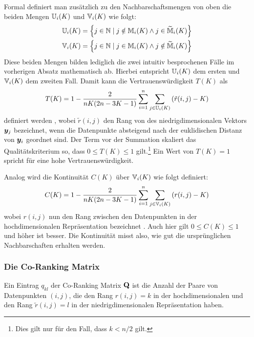 Formal definiert man zusätzlich zu den Nachbarschaftsmengen von oben die beiden Mengen
$\mathbb{U}_i(K)$ und $\mathbb{V}_i(K)$ wie folgt:
\begin{gather}
	\mathbb{U}_i(K) =  \left\{ j \in \mathbb{N} \mid j \notin \mathbb{M}_i(K) \land j \in \widetilde{\mathbb{M}}_i(K) \right\} \\
	\mathbb{V}_i(K) =  \left\{ j \in \mathbb{N} \mid j \in \mathbb{M}_i(K) \land j \notin \widetilde{\mathbb{M}}_i(K) \right\}
\end{gather}
Diese beiden Mengen bilden lediglich die zwei intuitiv besprochenen Fälle im vorherigen Absatz mathematisch ab. Hierbei entspricht $\mathbb{U}_i(K)$ dem ersten und $\mathbb{V}_i(K)$ dem zweiten Fall.
Damit kann die Vertrauenswürdigkeit $T(K)$ als
\begin{equation}
	T(K) = 1 - \frac{2}{nK(2n - 3K - 1)} \sum_{i = 1}^{n}\sum_{j \in \mathbb{U}_i(K) } \left( \tilde{r}(i, j) - K \right)
\end{equation}
definiert werden \parencite[487]{Venna.2001}, wobei $\tilde{r}(i, j)$ den Rang von des niedrigdimensionalen Vektors
$\bm{y}_j$ bezeichnet, wenn die Datenpunkte absteigend nach der euklidischen Distanz von
$\bm{y}_i$ geordnet sind. Der Term vor der Summation skaliert das Qualitätskriterium so, dass $0
	\leq T(K) \leq 1$ gilt.\footnote{Dies gilt nur für den Fall, dass $k < n/2$ gilt.} Ein Wert von
$T(K) = 1­$ spricht für eine hohe Vertrauenswürdigkeit.

Analog wird die Kontinuität $C(K)$ über $\mathbb{V}_i(K)$ wie folgt definiert:
\begin{equation}
	C(K) = 1 - \frac{2}{nK(2n - 3K - 1)} \sum_{i = 1}^{n}\sum_{j \in \mathbb{V}_i(K) } \left( r(i, j) - K \right)
\end{equation}
wobei $r(i, j)$ nun den Rang zwischen den Datenpunkten in der hochdimensionalen Repräsentation bezeichnet \parencite[487]{Venna.2001}. Auch hier gilt $0 \leq C(K) \leq 1$ und höher ist besser. Die Kontinuität
misst also, wie gut die ursprünglichen Nachbarschaften erhalten werden. 

\subsubsection{Die Co-Ranking Matrix}
Ein Eintrag $q_{kl}$ der Co-Ranking Matrix $\mathbf{Q}$ ist die Anzahl der Paare von Datenpunkten $(i,
	j)$, die den Rang $r(i, j) = k$ in der hochdimensionalen und den Rang $\tilde{r}(i, j) = l$ in der
niedrigdimensionalen Repräsentation haben.


